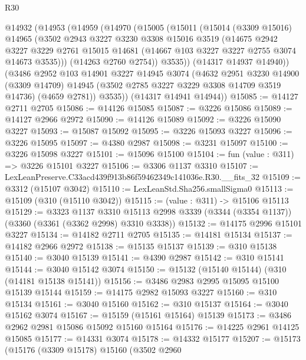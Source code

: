\begin{lexlean}{R30}
\begin{coremodule}
  @14932
    (@14953
      (@14959
        (@14970
          (@15005
            (@15011
              (@15014
                (@3309 @15016)
                @14965
                (@3502
                  @2943
                  @3227
                  @3230
                  @3308
                  @15016
                  @3519
                  (@14675
                    @2942
                    @3227
                    @3229
                    @2761
                    @15015
                    @14681
                    (@14667 @103 @3227 @3227 @2755 @3074 @14673 @3535)))
                (@14263 @2760 @2754))
              @3535))
          (@14317 @14937 @14940))
        (@3486
          @2952
          @103
          @14901
          @3227
          @14945
          @3074
          (@4632
            @2951
            @3230
            @14900
            (@3309 @14709)
            @14945
            (@3502 @2785 @3227 @3229 @3308 @14709 @3519 @14736)
            (@4659 @2781))
          @3535))
      (@14317 @14941 @14944))
@15085 := @14127 @2711 @2705
@15086 := @14126 @15085
@15087 := @3226 @15086
@15089 := @14127 @2966 @2972
@15090 := @14126 @15089
@15092 := @3226 @15090 @3227
@15093 := @15087 @15092
@15095 := @3226 @15093 @3227
@15096 := @3226 @15095
@15097 := @4380 @2987
@15098 := @3231 @15097
@15100 := @3226 @15098 @3227
@15101 := @15096 @15100
@15104 := fun (value : @311) => @3226 @15101 @3227
@15106 := @3306 @1137 @3310
@15107 := LexLeanPreserve.C33acd439f913b86f59462349c141036e.R30.__fits_32
@15109 := @3312 (@15107 @3042)
@15110 := LexLeanStd.Sha256.smallSigma0
@15113 := @15109 (@310 (@15110 @3042))
@15115 := (value : @311) -> @15106 @15113
@15129 := @3323
    @1137
    @3310
    @15113
    @2998
    @3339
    (@3344 (@3354 @1137))
    (@3360 (@3361 (@3362 @2998) @3310 @3338))
@15132 := @14175 @2996 @15101 @3227
@15134 := @14182 @2711 @2705
@15135 := @14181 @15134
@15137 := @14182 @2966 @2972
@15138 := @15135 @15137
@15139 := @310 @15138
@15140 := @3040 @15139
@15141 := @4390 @2987
@15142 := @310 @15141
@15144 := @3040 @15142 @3074
@15150 := @15132 (@15140 @15144) (@310 (@14181 @15138 @15141))
@15156 := @3486 @2983 @2995 @15095 @15100 @15139 @15144
@15159 := @14175 @2982 @15093 @3227
@15160 := @310 @15134
@15161 := @3040 @15160
@15162 := @310 @15137
@15164 := @3040 @15162 @3074
@15167 := @15159 (@15161 @15164) @15139
@15173 := @3486 @2962 @2981 @15086 @15092 @15160 @15164
@15176 := @14225 @2961 @14125 @15085
@15177 := @14331 @3074
@15178 := @14332 @15177
@15207 := @15173
    (@15176
      (@3309 @15178)
      @15160
      (@3502
        @2960

\end{coremodule}
\end{lexlean}
